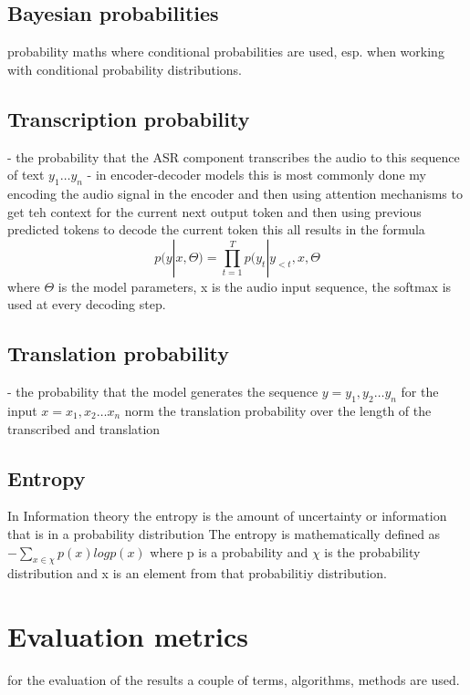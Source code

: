 \subsection{Bayesian probabilities}
probability maths where conditional probabilities are used, esp. when working with conditional probability distributions.

\subsection{Transcription probability}
- the probability that the ASR component transcribes the audio to this sequence of text $y_1\dots y_n$ 
- in encoder-decoder models this is most commonly done my encoding the audio signal in the encoder and then using attention mechanisms to get teh context for the current next output token and then using previous predicted tokens to decode the current token
this all results in the formula $$p(y|x,\Theta)=\prod_{t=1}^T p(y_t|y_{<t}, x, \Theta $$ where $\Theta$ is the model parameters, x is the audio input sequence, the softmax is used at every decoding step.



\subsection{Translation probability}
- the probability that the model generates the sequence $y = y_1, y_2 \dots y_n$ for the input $x=x_1, x_2 \dots x_n$
norm the translation probability over the length of the transcribed and translation 
\subsection{Entropy}
In Information theory the entropy is the amount of uncertainty or information that is in a probability distribution
The entropy is mathematically defined as $- \sum_{x\in \chi} p(x) log p(x)$ where p is a probability and $\chi$ is the probability distribution and x is an element from that probabilitiy distribution.
\section{Evaluation metrics}
 for the evaluation of the results a couple of terms, algorithms, methods are used. 
 
